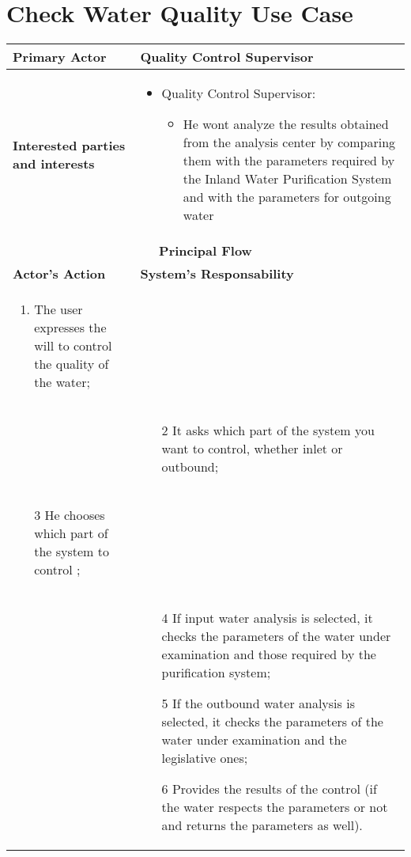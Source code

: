 \section{Check Water Quality Use Case}

\begin{longtable}{|p{7cm}|p{7cm}|}

\hline
\textbf{Primary Actor} & Quality Control Supervisor
\\


\hline
\textbf{Interested parties and interests} &
\begin{itemize}
\item Quality Control Supervisor:
	\begin{itemize}
 	\item He wont analyze the results obtained from the analysis center by comparing them with the parameters required by the Inland Water Purification System and with the parameters for outgoing water
	\end{itemize}
\end{itemize}
\\


\hline
\multicolumn{2}{|c|}{\textbf{Principal Flow}} \\

\hline
\textbf{Actor's Action} & \textbf{System's Responsability}\\

\hline

\begin{enumerate}
\item The user expresses the will to control the quality of the water;
\end{enumerate} &\\

& 
\begin{enumerate}
\item[2]It asks which part of the system you want to control, whether inlet or outbound;
\end{enumerate}\\

\begin{enumerate}
\item[3]He chooses which part of the system to control	;			
\end{enumerate} &\\


& 
\begin{enumerate}
\item[4]If input water analysis is selected, it checks the parameters of the water under examination and those required by the purification system;
\item[5]If the outbound water analysis is selected, it checks the parameters of the water under examination and the legislative ones;
\item[6]Provides the results of the control (if the water respects the parameters or not and returns the parameters as well).
\end{enumerate}\\

\hline
\end{longtable}

